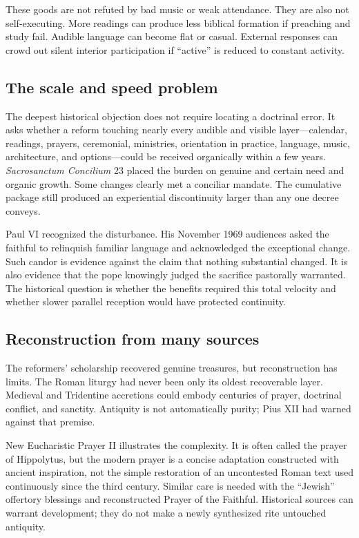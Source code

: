 These goods are not refuted by bad music or weak attendance. They are also not self-executing. More readings can produce less biblical formation if preaching and study fail. Audible language can become flat or casual. External responses can crowd out silent interior participation if “active” is reduced to constant activity.

\subsection{The scale and speed problem}

The deepest historical objection does not require locating a doctrinal error. It asks whether a reform touching nearly every audible and visible layer—calendar, readings, prayers, ceremonial, ministries, orientation in practice, language, music, architecture, and options—could be received organically within a few years. \emph{Sacrosanctum Concilium} 23 placed the burden on genuine and certain need and organic growth. Some changes clearly met a conciliar mandate. The cumulative package still produced an experiential discontinuity larger than any one decree conveys.

Paul VI recognized the disturbance. His November 1969 audiences asked the faithful to relinquish familiar language and acknowledged the exceptional change. Such candor is evidence against the claim that nothing substantial changed. It is also evidence that the pope knowingly judged the sacrifice pastorally warranted. The historical question is whether the benefits required this total velocity and whether slower parallel reception would have protected continuity.

\subsection{Reconstruction from many sources}

The reformers' scholarship recovered genuine treasures, but reconstruction has limits. The Roman liturgy had never been only its oldest recoverable layer. Medieval and Tridentine accretions could embody centuries of prayer, doctrinal conflict, and sanctity. Antiquity is not automatically purity; Pius XII had warned against that premise.

New Eucharistic Prayer II illustrates the complexity. It is often called the prayer of Hippolytus, but the modern prayer is a concise adaptation constructed with ancient inspiration, not the simple restoration of an uncontested Roman text used continuously since the third century. Similar care is needed with the “Jewish” offertory blessings and reconstructed Prayer of the Faithful. Historical sources can warrant development; they do not make a newly synthesized rite untouched antiquity.

